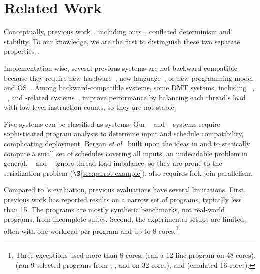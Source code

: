 \vspace{-.02in}
\section{Related Work} \label{sec:parrot-related}
\vspace{-.02in}

  Conceptually, previous
work~\cite{dthreads:sosp11, cui:tern:osdi10, peregrine:sosp11,
  determinator:osdi10}, including ours~\cite{cui:tern:osdi10,
  peregrine:sosp11}, conflated determinism and stability.  To our
knowledge, we are the first to distinguish these two separate
properties~\cite{smt:cacm,smt:hotpar13}.

Implementation-wise, several previous systems are not backward-compatible
because they require new hardware~\cite{dmp:asplos09}, new
language~\cite{dpj:oopsla09}, or new programming model and
OS~\cite{determinator:osdi10}.  Among backward-compatible systems, some
DMT systems, including \kendo~\cite{kendo:asplos09},
\coredet~\cite{coredet:asplos10}, and \coredet-related
systems~\cite{dos:osdi10, ddos:asplos13}, improve performance by balancing
each thread's load with low-level instruction counts, so they are not
stable.

Five systems can be classified as \smt systems.  Our
\tern~\cite{cui:tern:osdi10} and \peregrine~\cite{peregrine:sosp11} systems
require sophisticated program analysis to determine input and schedule
compatibility, complicating deployment. Bergan {\it et
  al}~\cite{bergan:oopsla13} built upon the ideas in \tern and \peregrine
to statically compute a small set of schedules covering all inputs, an
undecidable problem in general.  \grace~\cite{grace:oopsla09} and \dthreads~\cite{dthreads:sosp11} ignore thread load
imbalance, so they are prone to the serialization problem
($\S$\ref{sec:parrot-example}). \grace also requires
fork-join parallelism.

Compared to \parrot's evaluation, previous evaluations have several limitations.
First, previous work has reported results on a narrow set of programs,
typically less than 15.  The programs are mostly synthetic benchmarks, not
real-world programs, from incomplete suites.  Second, the experimental
setups are limited, often with one workload per program and up to 8
cores.\footnote{Three exceptions used more than 8 cores:
  \cite{kendo:wodet11} (ran a 12-line program on 48 cores),
  \cite{aviram:thesis} (ran 9 selected programs from \parsec, \splashx, and
  \npb on 32 cores), and \cite{dmp:asplos09} (emulated 16 cores).}

